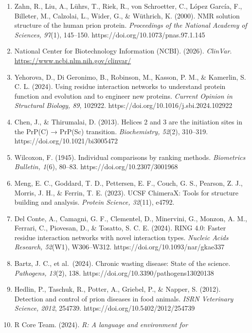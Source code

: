 \documentclass[
  twocolumn]{biophys-new-mod}
\begin{document}
\begin{enumerate}
  Mastrianni, J. (2010). The genetics of prion diseases. \emph{Genetics
  in Medicine, 12}, 187--195.
  https://doi.org/10.1097/GIM.0b013e3181cd7374
\item
  Zahn, R., Liu, A., Lührs, T., Riek, R., von Schroetter, C., López
  García, F., Billeter, M., Calzolai, L., Wider, G., \& Wüthrich, K.
  (2000). NMR solution structure of the human prion protein.
  \emph{Proceedings of the National Academy of Sciences, 97}(1),
  145--150. https://doi.org/10.1073/pnas.97.1.145
\item
  National Center for Biotechnology Information (NCBI). (2026).
  \emph{ClinVar}. \url{https://www.ncbi.nlm.nih.gov/clinvar/}
\item
  Yehorova, D., Di Geronimo, B., Robinson, M., Kasson, P. M., \&
  Kamerlin, S. C. L. (2024). Using residue interaction networks to
  understand protein function and evolution and to engineer new
  proteins. \emph{Current Opinion in Structural Biology, 89}, 102922.
  https://doi.org/10.1016/j.sbi.2024.102922
\item
  Chen, J., \& Thirumalai, D. (2013). Helices 2 and 3 are the initiation
  sites in the PrP(C) → PrP(Sc) transition. \emph{Biochemistry, 52}(2),
  310--319. https://doi.org/10.1021/bi3005472
\item
  Wilcoxon, F. (1945). Individual comparisons by ranking methods.
  \emph{Biometrics Bulletin, 1}(6), 80--83.
  https://doi.org/10.2307/3001968
\item
  Meng, E. C., Goddard, T. D., Pettersen, E. F., Couch, G. S., Pearson,
  Z. J., Morris, J. H., \& Ferrin, T. E. (2023). UCSF ChimeraX: Tools
  for structure building and analysis. \emph{Protein Science, 32}(11),
  e4792.
\item
  Del Conte, A., Camagni, G. F., Clementel, D., Minervini, G., Monzon,
  A. M., Ferrari, C., Piovesan, D., \& Tosatto, S. C. E. (2024). RING
  4.0: Faster residue interaction networks with novel interaction types.
  \emph{Nucleic Acids Research, 52}(W1), W306--W312.
  https://doi.org/10.1093/nar/gkae337
\item
  Bartz, J. C., et al.~(2024). Chronic wasting disease: State of the
  science. \emph{Pathogens, 13}(2), 138.
  https://doi.org/10.3390/pathogens13020138
\item
  Hedlin, P., Taschuk, R., Potter, A., Griebel, P., \& Napper, S.
  (2012). Detection and control of prion diseases in food animals.
  \emph{ISRN Veterinary Science, 2012}, 254739.
  https://doi.org/10.5402/2012/254739
\item
  R Core Team. (2024). \emph{R: A language and environment for
}
\end{enumerate}
\end{document}
